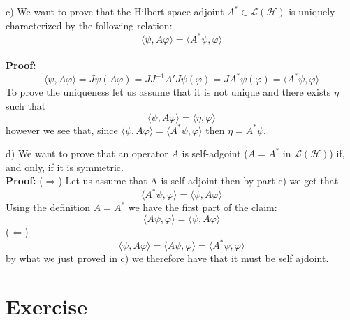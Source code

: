 \documentclass{article}
\newcommand{\1}{1\!\!1}
\newcommand{\proof}{\\ \textbf{Proof: }}
\begin{document}
c) We want to prove that the Hilbert space adjoint $A^* \in \mathcal L (\mathcal H)$ is uniquely characterized by the following relation:
\[
    \langle \psi, A \varphi \rangle = \langle A^* \psi, \varphi \rangle
\]
\proof 
\[
    \langle \psi, A \varphi \rangle = J \psi (A \varphi) = JJ^{-1} A' J \psi (\varphi) = J A^* \psi (\varphi) = \langle A^* \psi, \varphi \rangle 
\]
To prove the uniqueness let us assume that it is not unique and there exists $\eta$ such that
\[
    \langle \psi, A \varphi \rangle = \langle \eta, \varphi \rangle
\]
however we see that, since $\langle \psi, A \varphi \rangle = \langle A^* \psi, \varphi \rangle$ then $ \eta = A^* \psi$.

d) We want to prove that an operator $A$ is self-adgoint ($A= A^*$ in $\mathcal L(\mathcal H)$) if, and only, if it is symmetric.
\proof ($\Rightarrow$) Let us assume that A is self-adjoint then by part c) we get that 
\[
    \langle A^* \psi, \varphi \rangle = \langle \psi, A \varphi \rangle
\]
Using the definition $A= A^*$ we have the first part of the claim:
\[
    \langle A \psi, \varphi \rangle = \langle \psi, A \varphi \rangle
\]
($\Leftarrow$)
\[
    \langle \psi, A \varphi \rangle = \langle A \psi, \varphi \rangle = \langle  A^*\psi, \varphi \rangle
\]
by what we just proved in c) we therefore have that it must be self ajdoint.
\section{Exercise}
\end{document}

